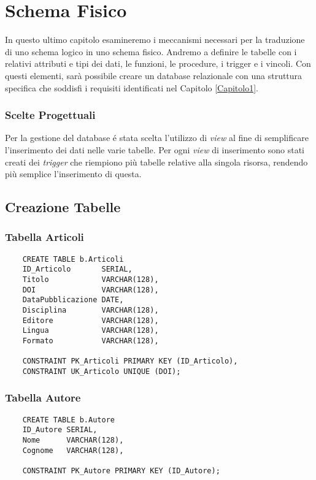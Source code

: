 \chapter{Schema Fisico}

In questo ultimo capitolo esamineremo i meccanismi necessari per la traduzione di uno schema logico 
in uno schema fisico. Andremo a definire le tabelle con i relativi attributi e tipi dei dati, le
funzioni, le procedure, i trigger e i vincoli. Con questi elementi, sar\`a possibile creare un database
relazionale con una struttura specifica che soddisfi i requisiti identificati nel Capitolo \ref{Capitolo1}.

\subsection{Scelte Progettuali}
Per la gestione del database \'e stata scelta l'utilizzo di \textit{view} al fine di semplificare 
l'inserimento dei dati nelle varie tabelle. Per ogni \textit{view} di inserimento sono stati creati 
dei \textit{trigger} che riempiono più tabelle relative alla singola risorsa, rendendo più semplice 
l'inserimento di questa.

\section{Creazione Tabelle}
\subsection{Tabella Articoli}
\begin{lstlisting}
    CREATE TABLE b.Articoli
    ID_Articolo       SERIAL,
    Titolo            VARCHAR(128),
    DOI               VARCHAR(128),
    DataPubblicazione DATE,
    Disciplina        VARCHAR(128),
    Editore           VARCHAR(128),
    Lingua            VARCHAR(128),
    Formato           VARCHAR(128),

    CONSTRAINT PK_Articoli PRIMARY KEY (ID_Articolo),
    CONSTRAINT UK_Articolo UNIQUE (DOI);
\end{lstlisting}
\subsection{Tabella Autore}
\begin{lstlisting}
    CREATE TABLE b.Autore
    ID_Autore SERIAL,
    Nome      VARCHAR(128),
    Cognome   VARCHAR(128),

    CONSTRAINT PK_Autore PRIMARY KEY (ID_Autore);
\end{lstlisting}
